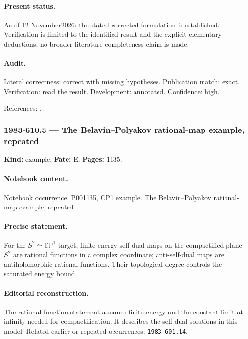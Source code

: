 \paragraph{Present status.} As of 12 November2026: the stated corrected formulation is established. Verification is limited to the identified result and the explicit elementary deductions; no broader literature-completeness claim is made.

\paragraph{Audit.} Literal correctness: correct with missing hypotheses. Publication match: exact. Verification: read the result. Development: annotated. Confidence: high.

\noindent References: \citep{perelomov1981instantons}.\par

\subsubsection{1983-610.3 --- The Belavin--Polyakov rational-map example, repeated}

\label{item:1983-610.3}

\noindent\textbf{Kind:} example. \textbf{Fate:} E. \textbf{Pages:} 1135.\par

\paragraph{Notebook content.} Notebook occurrence: P001135, CP1 example. The Belavin--Polyakov rational-map example, repeated.

\paragraph{Precise statement.} For the \(S^2\simeq\mathbb{CP}^1\) target, finite-energy self-dual maps on the compactified plane \(S^2\) are rational functions in a complex coordinate; anti-self-dual maps are antiholomorphic rational functions. Their topological degree controls the saturated energy bound.

\paragraph{Editorial reconstruction.} The rational-function statement assumes finite energy and the constant limit at infinity needed for compactification. It describes the self-dual solutions in this model. Related earlier or repeated occurrences: \texttt{1983-601.14}.

